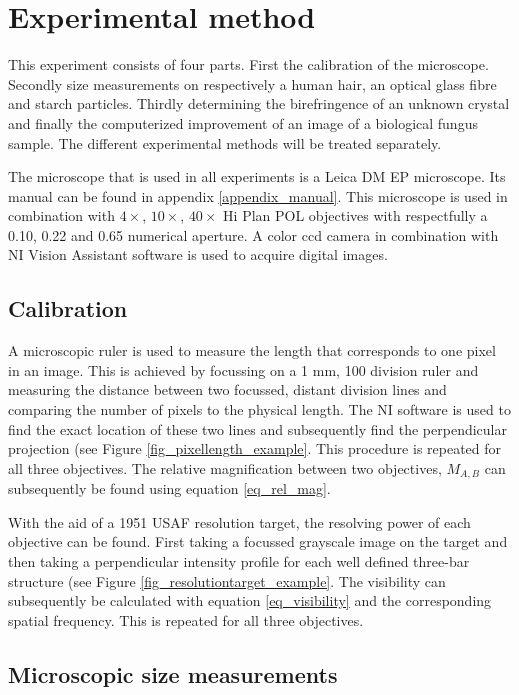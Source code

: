\section{Experimental method}

This experiment consists of four parts. First the calibration of the microscope. Secondly size measurements on respectively a human hair, an optical glass fibre and starch particles. Thirdly determining the birefringence of an unknown crystal and finally the computerized improvement of an image of a biological fungus sample. The different experimental methods will be treated separately. 

The microscope that is used in all experiments is a Leica DM EP microscope. Its manual can be found in appendix \ref{appendix_manual}. This microscope is used in combination with $4\times$, $10\times$, $40\times$ Hi Plan POL objectives with respectfully a 0.10, 0.22 and 0.65 numerical aperture. A color ccd camera in combination with NI Vision Assistant software is used to acquire digital images.

\subsection{Calibration}
A microscopic ruler is used to measure the length that corresponds to one pixel in an image. This is achieved by focussing on a 1 mm, 100 division ruler and measuring the distance between two focussed, distant division lines and comparing the number of pixels to the physical length. The NI software is used to find the exact location of these two lines and subsequently find the perpendicular projection (see Figure \ref{fig_pixellength_example}. This procedure is repeated for all three objectives. The relative magnification between two objectives, $M_{A,B}$ can subsequently be found using equation \ref{eq_rel_mag}.

\bigskip

With the aid of a 1951 USAF resolution target, the resolving power of each objective can be found. First taking a focussed grayscale image  on the target and then taking a perpendicular intensity profile for each well defined three-bar structure (see Figure \ref{fig_resolutiontarget_example}. The visibility can subsequently be calculated with equation \ref{eq_visibility} and the corresponding spatial frequency. This is repeated for all three objectives.

\subsection{Microscopic size measurements}

